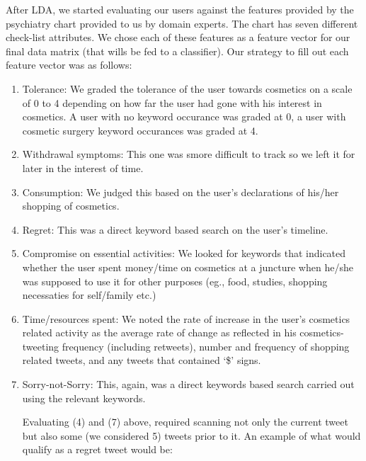 \documentclass[11pt]{article}
\begin{document}
After LDA, we started evaluating our users against the features provided by the psychiatry 
chart provided to us by domain experts. The chart has seven different check-list attributes. We 
chose each of these features as a feature vector for our final data matrix (that wills be fed to
a classifier). Our strategy to fill out each feature vector was as follows:
\begin{enumerate}
 \item Tolerance: We graded the tolerance of the user towards cosmetics on a scale of 0 to 4 depending
 on how far the user had gone with his interest in cosmetics. A user with no keyword occurance
 was graded at 0, a user with cosmetic surgery keyword occurances was graded at 4.
 \item Withdrawal symptoms: This one was smore difficult to track so we left it for later
 in the interest of time.
 \item Consumption: We judged this based on the user's declarations of his/her shopping of cosmetics.
  \item Regret: This was a direct keyword based search on the user's timeline. 
 \item Compromise on essential activities: We looked for keywords that indicated whether the user spent
 money/time on cosmetics at a juncture when he/she was supposed to use it for other purposes (eg., food,
 studies, shopping necessaties for self/family etc.)
 \item Time/resources spent: We noted the rate of increase in the user's cosmetics related activity
 as the average rate of change as reflected in his cosmetics-tweeting frequency (including 
 retweets), number and frequency of shopping related tweets, and any tweets that contained `\$' signs. 
 \item Sorry-not-Sorry: This, again, was a direct keywords based search carried out using the 
 relevant keywords.
 
Evaluating (4) and (7) above, required scanning not only the current tweet but also some (we considered 5) tweets 
prior to it. An example of what would qualify as a regret tweet would be:

\end{enumerate}
\end{document}
